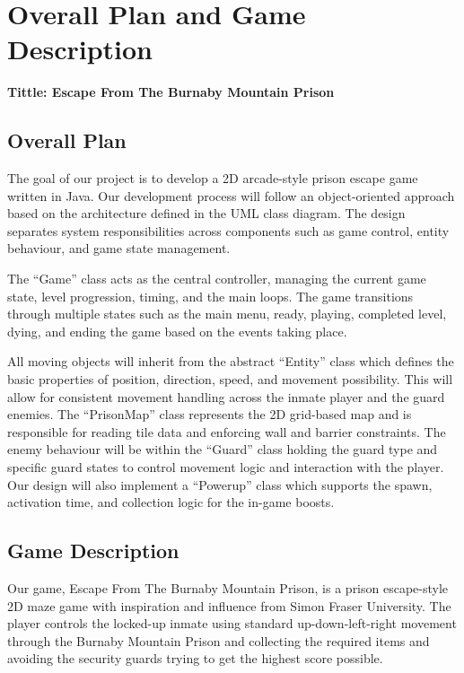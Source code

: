 \documentclass[11pt]{article}
\begin{document}
\section*{Overall Plan and Game Description}

\textbf{Tittle: Escape From The Burnaby Mountain Prison}

\subsection*{Overall Plan}
The goal of our project is to develop a 2D arcade-style prison escape game written in Java. Our development process will follow an object-oriented approach based on the architecture defined in the UML class diagram. The design separates system responsibilities across components such as game control, entity behaviour, and game state management. 

The “Game” class acts as the central controller, managing the current game state, level progression, timing, and the main loops. The game transitions through multiple states such as the main menu, ready, playing, completed level, dying, and ending the game based on the events taking place.

All moving objects will inherit from the abstract “Entity” class which defines the basic properties of position, direction, speed, and movement possibility. This will allow for consistent movement handling across the inmate player and the guard enemies. The “PrisonMap” class represents the 2D grid-based map and is responsible for reading tile data and enforcing wall and barrier constraints. The enemy behaviour will be within the “Guard” class holding the guard type and specific guard states to control movement logic and interaction with the player. Our design will also implement a “Powerup” class which supports the spawn, activation time, and collection logic for the in-game boosts. 

\subsection*{Game Description}
Our game, Escape From The Burnaby Mountain Prison, is a prison escape-style 2D maze game with inspiration and influence from Simon Fraser University. The player controls the locked-up inmate using standard up-down-left-right movement through the Burnaby Mountain Prison and collecting the required items and avoiding the security guards trying to get the highest score possible.
\end{document}
